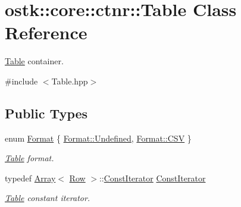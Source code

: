 \hypertarget{classostk_1_1core_1_1ctnr_1_1_table}{}\section{ostk\+:\+:core\+:\+:ctnr\+:\+:Table Class Reference}
\label{classostk_1_1core_1_1ctnr_1_1_table}


\hyperlink{classostk_1_1core_1_1ctnr_1_1_table}{Table} container.  




{\ttfamily \#include $<$Table.\+hpp$>$}

\subsection*{Public Types}
\begin{DoxyCompactItemize}
\item 
enum \hyperlink{classostk_1_1core_1_1ctnr_1_1_table_aacb867db63d74cac28a388029bf161d2}{Format} \{ \hyperlink{classostk_1_1core_1_1ctnr_1_1_table_aacb867db63d74cac28a388029bf161d2aec0fc0100c4fc1ce4eea230c3dc10360}{Format\+::\+Undefined}, 
\hyperlink{classostk_1_1core_1_1ctnr_1_1_table_aacb867db63d74cac28a388029bf161d2acc8d68c551c4a9a6d5313e07de4deafd}{Format\+::\+C\+SV}
 \}\begin{DoxyCompactList}\small\item\em \hyperlink{classostk_1_1core_1_1ctnr_1_1_table}{Table} format. \end{DoxyCompactList}
\item 
typedef \hyperlink{classostk_1_1core_1_1ctnr_1_1_array}{Array}$<$ \hyperlink{classostk_1_1core_1_1ctnr_1_1table_1_1_row}{Row} $>$\+::\hyperlink{classostk_1_1core_1_1ctnr_1_1_table_a44e6a375120737f0675ea6689022050f}{Const\+Iterator} \hyperlink{classostk_1_1core_1_1ctnr_1_1_table_a44e6a375120737f0675ea6689022050f}{Const\+Iterator}
\begin{DoxyCompactList}\small\item\em \hyperlink{classostk_1_1core_1_1ctnr_1_1_table}{Table} constant iterator. \end{DoxyCompactList}\end{DoxyCompactItemize}

